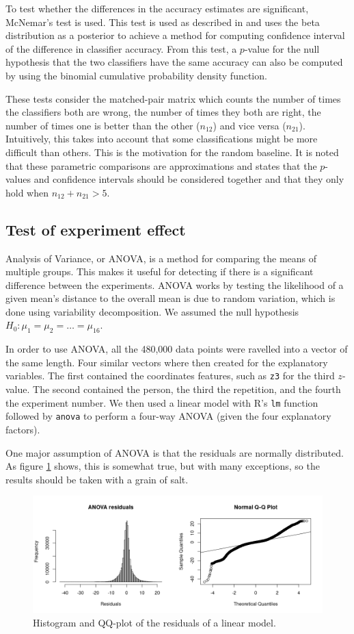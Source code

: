 \documentclass[11pt,fleqn]{article}
\begin{document}
To test whether the differences in the accuracy estimates are significant, McNemar's test is used. 
This test is used as described in \cite[Method 11.3.2]{Tue} and uses the beta distribution as a posterior to achieve a method for computing confidence interval of the difference in classifier accuracy.
From this test, a \(p\)-value for the null hypothesis that the two classifiers have the same accuracy can also be computed by using the binomial cumulative probability density function.

These tests consider the matched-pair matrix which counts the number of times the classifiers both are wrong, the number of times they both are right, the number of times one is better than the other (\(n_{12}\)) and vice versa (\(n_{21}\)).
Intuitively, this takes into account that some classifications might be more difficult than others. 
This is the motivation for the random baseline. It is noted that these parametric comparisons are approximations and \cite{Tue} states that the \(p\)-values and confidence intervals should be considered together and that they only hold when \(n_{12}+n_{21}> 5\).
\subsection{Test of experiment effect}\label{subsec:expeffect}
Analysis of Variance, or ANOVA, is a method for comparing the means of multiple groups.
This makes it useful for detecting if there is a significant difference between the experiments.
ANOVA works by testing the likelihood of a given mean's distance to the overall mean is due to random variation, which is done using variability decomposition.
We assumed the null hypothesis $ H_0: \mu_1=\mu_2=\ldots=\mu_{16} $.

In order to use ANOVA, all the 480,000 data points were ravelled into a vector of the same length.
Four similar vectors where then created for the explanatory variables.
The first contained the coordinates features, such as \texttt{z3} for the third $ z $-value.
The second contained the person, the third the repetition, and the fourth the experiment number.
We then used a linear model with R's \texttt{lm} function followed by \texttt{anova} to perform a four-way ANOVA (given the four explanatory factors).

One major assumption of ANOVA is that the residuals are normally distributed.
As figure \ref{fig:qq} shows, this is somewhat true, but with many exceptions, so the results should be taken with a grain of salt.
\begin{figure}[H]
	\centering
	\includegraphics[width=.5\textwidth]{qq}
	\caption{Histogram and QQ-plot of the residuals of a linear model.}\label{fig:qq}
\end{figure}
\end{document}
